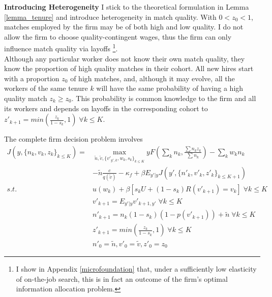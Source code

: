 \newline
\textbf{Introducing Heterogeneity}  I stick to the theoretical formulation in Lemma \ref{lemma_tenure} and introduce heterogeneity in match quality. With $0<z_0<1$, matches employed by the firm may be of both high and low quality. I do not allow the firm to choose quality-contingent wages, thus the firm can only influence match quality via layoffs \footnote{I show in Appendix \ref{microfoundation} that, under a sufficiently low elasticity of on-the-job search, this is in fact an outcome of the firm's optimal information allocation problem.}. \\
Although any particular worker does not know their own match quality, they know the proportion of high quality matches in their cohort. All new hires start with a proportion $z_0$ of high matches, and, although it may evolve, all the workers of the same tenure $k$ will have the same probability of having a high quality match $z_k\geq z_0$. This probability is common knowledge to the firm and all its workers and depends on layoffs in the corresponding cohort to $z'_{k+1}=min(\frac{z_k}{1-s_k},1)\; \forall k\leq K$.
\\
\begin{definition} \label{firmproblem}
The complete firm decision problem involves
\begin{equation*}
    \begin{split}
 J(y,\{n_k,v_k,z_k\}_{k\leq K}) =
    & \max_{\tilde{n},\tilde{v},\{v'_{y',k},w_{k},s_{k}\}_{k\leq K}} 
    yF(\sum_k n_k,\frac{\sum n_kz_k}{\sum n_k})-
    \sum_k w_kn_k \\
    &-\tilde{n}\frac{c}{q(\tilde{v})}-\kappa_f
    +\beta E_{y'|y} J(y',\{n'_k,v'_k,z'_k\}_{k\leq K+1}) \\
     s.t. \: & u(w_k) + \beta [s_k U + (1-s_k)R(v'_{k+1})=v_k] \; \forall k\leq K \\
    & v'_{k+1} = E_{y'|y} v'_{k+1,y'} \; \forall k\leq K \\
    & n'_{k+1} = n_k(1-s_k)(1-p(v'_{k+1}))+\tilde{n}\; \forall k\leq K \\
    & z'_{k+1} = min(\frac{z_k}{1-s_k},1)\; \forall k\leq K \\
    & n'_0 = \tilde{n}, v'_0 = \tilde{v}, z'_0 = z_0
    \end{split}
\end{equation*}
\end{definition}


